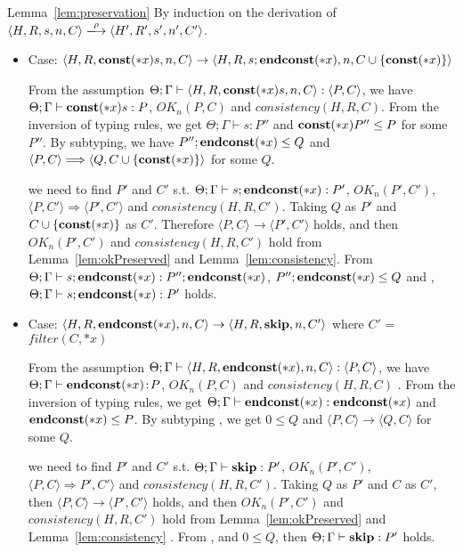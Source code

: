 \begin{pfof}{Lemma~\ref{lem:preservation}}
By induction on the derivation of \(\langle H, R, s, n, C \rangle
\xlongrightarrow{\rho} \langle H' ,R' ,s', n', C' \rangle\).

\begin{itemize}

\item Case: \( \langle H, R, \mathbf{const}(*x) s, n, C \rangle
  \rightarrow \langle H, R, s;\mathbf{endconst}(*x), n, C\cup
  \{\mathbf{const}(*x)\} \rangle \)

  From the assumption \( \Theta; \Gamma \vdash \langle H, R,
  \mathbf{const}(*x) s, n, C \rangle : \langle P, C \rangle\), we have \(
  \Theta; \Gamma \vdash \mathbf{const}(*x) s: P \), \( OK_n(P, C) \) and
  \(consistency(H, R, C)\). From the inversion of typing rules, we get
  \( \Theta; \Gamma \vdash s:P'' \) and \( \mathbf{const}(*x) P'' \le P \) for
  some \( P'' \). By subtyping, we have \( P'';\mathbf{endconst}(*x) \le Q \) and
  \( \langle P, C \rangle \Longrightarrow \langle Q, C\cup
  \{\mathbf{const}(*x)\} \rangle \) for some \( Q \).

  we need to find \(P'\) and \(C'\) s.t. \( \Theta; \Gamma \vdash
  s;\mathbf{endconst}(*x):P'\), \( OK_n(P', C')\), \( \langle P, C' \rangle
  \Longrightarrow \langle P', C' \rangle \) and \(consistency(H, R,
  C')\). Taking \( Q \) as \( P'\) and \( C \cup \{\mathbf{const}(*x)\} \) as
  \(C'\). Therefore \( \langle P, C \rangle \rightarrow \langle P', C'
  \rangle\) holds, and then \( OK_n(P', C')\) and \(consistency(H, R,
  C')\) hold from Lemma~\ref{lem:okPreserved} and
  Lemma~\ref{lem:consistency}. From \( \Theta; \Gamma \vdash
  s;\mathbf{endconst}(*x):P'';\mathbf{endconst}(*x) \), \( P'';\mathbf{endconst}(*x) \le Q \) and
  , \( \Theta; \Gamma \vdash s;\mathbf{endconst}(*x):P'\) holds.

\item Case: \( \langle H, R, \mathbf{endconst}(*x), n, C \rangle \rightarrow
  \langle H, R, \mathbf{skip}, n, C' \rangle \) where \(C'\) = \(filter(C,
  *x)\)

   From the assumption \( \Theta; \Gamma \vdash \langle H, R,
   \mathbf{endconst}(*x), n, C \rangle : \langle P, C \rangle\), we have \(
   \Theta; \Gamma \vdash \mathbf{endconst}(*x) \!:\! P\), \( OK_n(P, C) \) and
   \(consistency(H, R, C)\) . From the inversion of typing rules, we
   get \( \Theta; \Gamma \vdash \mathbf{endconst}(*x):\mathbf{endconst}(*x) \) and \(
   \mathbf{endconst}(*x) \le P \). By subtyping , we get \( 0 \le Q \) and \(
   \langle P, C \rangle \rightarrow \langle Q, C \rangle\) for some
   \( Q \).

   we need to find \(P'\) and \(C'\) s.t. \( \Theta; \Gamma \vdash
  \mathbf{skip}:P'\), \( OK_n(P', C')\), \( \langle P, C \rangle
  \Longrightarrow P', C' \rangle \) and \(consistency(H, R,
  C')\). Taking \( Q \) as \( P'\) and \(C\) as \(C'\), then \(
  \langle P, C \rangle \rightarrow \langle P', C' \rangle\) holds, and
  then \( OK_n(P', C')\) and \(consistency(H, R, C')\) hold from
  Lemma~\ref{lem:okPreserved} and Lemma~\ref{lem:consistency} . From
  ,  and \( 0 \le Q\), then \( \Theta; \Gamma
  \vdash \mathbf{skip}:P'\) holds.


\end{itemize}
\end{pfof}

